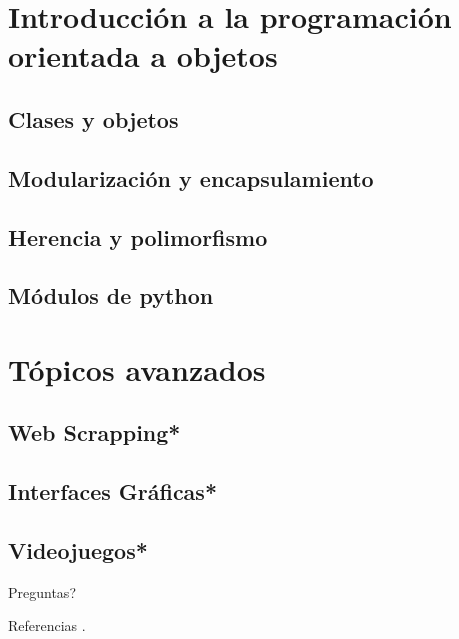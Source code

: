\documentclass[10pt]{beamer}
\newcommand{\themename}{\textbf{\textsc{metropolis}}\xspace}
\begin{document}
\section{Introducción a la programación orientada a objetos}
\subsection{Clases y objetos}
\subsection{Modularización y encapsulamiento}
\subsection{Herencia y polimorfismo}
\subsection{Módulos de python}

\section{Tópicos avanzados}
\subsection{Web Scrapping*}
\subsection{Interfaces Gráficas*}
\subsection{Videojuegos*}

{
\begin{frame}[standout]
  Preguntas?
\end{frame}
}

\appendix




\begin{frame}[allowframebreaks]{Referencias}
.
\end{frame}
\end{document}
